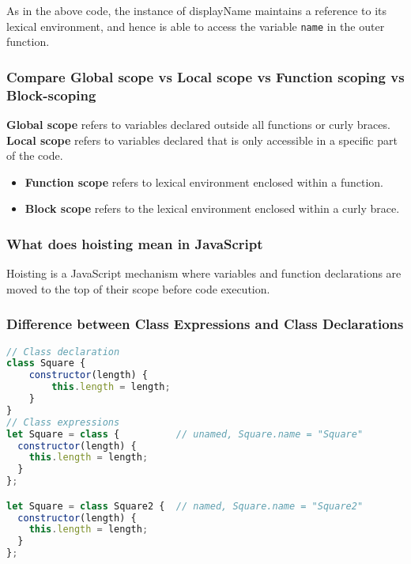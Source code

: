 \documentclass[12pt, a4paper]{article}
\newcommand{\code}[1]{\texttt{#1}}
\begin{document}
As in the above code, the instance of displayName maintains a reference to its lexical environment, and hence is able to access the variable \code{name} in the outer function.

\subsubsection*{Compare Global scope vs Local scope vs Function scoping vs Block-scoping}
\textbf{Global scope} refers to variables declared outside all functions or curly braces.\newline
\textbf{Local scope} refers to variables declared that is only accessible in a specific part of the code.
\begin{itemize}
    \item \textbf{Function scope} refers to lexical environment enclosed within a function.
    \item \textbf{Block scope} refers to the lexical environment enclosed within a curly brace.
\end{itemize}

\subsubsection*{What does hoisting mean in JavaScript}
Hoisting is a JavaScript mechanism where variables and function declarations are moved to the top of their scope before code execution.

\subsubsection*{Difference between Class Expressions and Class Declarations}
\begin{mdframed}[backgroundcolor=light-gray, roundcorner=10pt,leftmargin=1, rightmargin=1, innerleftmargin=20, innertopmargin=5,innerbottommargin=5, outerlinewidth=1, linecolor=light-gray]
\begin{lstlisting}[language=JavaScript]
// Class declaration
class Square {
    constructor(length) {
        this.length = length;
    }
}
// Class expressions
let Square = class {          // unamed, Square.name = "Square"
  constructor(length) {
    this.length = length;
  }
};

let Square = class Square2 {  // named, Square.name = "Square2"
  constructor(length) {
    this.length = length;
  }
};
\end{lstlisting}
\end{mdframed}
\end{document}
